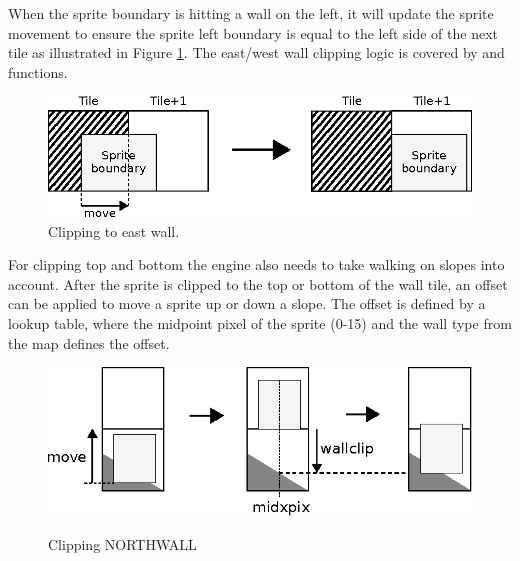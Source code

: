 \documentclass[book.tex]{subfiles}
\begin{document}
\par
When the sprite boundary is hitting a wall on the left, it will update the sprite movement to ensure the sprite left boundary is equal to the left side of the next tile as illustrated in Figure \ref{fig:clipping_east}. The east/west wall clipping logic is covered by  and  functions. \\

\begin{figure}[H]
  \centering
  \includegraphics[width=\textwidth]{imgs/drawings/clipping_east.eps}
  \caption{Clipping to east wall.}
  \label{fig:clipping_east}  
\end{figure}

\par
\begin{minipage}{\textwidth}
  
\end{minipage}
\label{wallclip_array}
\par
For clipping top and bottom the engine also needs to take walking on slopes into account. After the sprite is clipped to the top or bottom of the wall tile, an offset can be applied to move a sprite up or down a slope. The offset is defined by a lookup table, where the midpoint pixel of the sprite (0-15) and the wall type from the map defines the offset.

\begin{figure}[H]
  \centering
  \includegraphics[width=\textwidth]{imgs/drawings/clipping_north.eps}
  \label{fig:clipping_north}
  \caption{Clipping NORTHWALL}
\end{figure}
\end{document}
